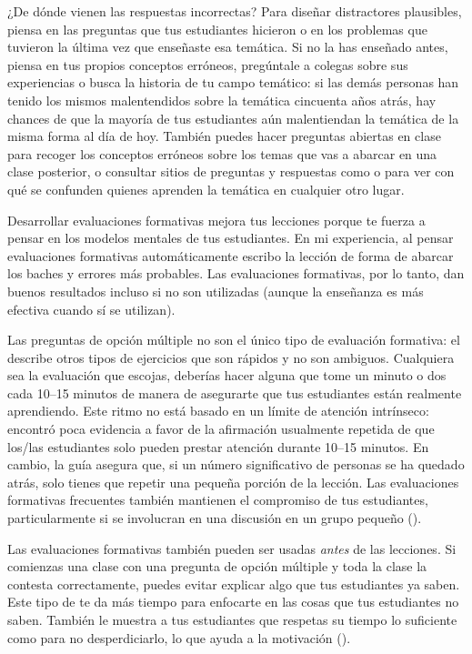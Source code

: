 \begin{aside}{¿De dónde vienen las respuestas incorrectas?}
 Para diseñar distractores plausibles,
piensa en las preguntas que tus estudiantes hicieron o en los problemas que tuvieron la última vez que enseñaste esa temática.
Si no la has enseñado antes,
piensa en tus propios conceptos erróneos,
pregúntale a colegas sobre sus experiencias
o busca la historia de tu campo temático:
si las demás personas han tenido los mismos malentendidos sobre la temática cincuenta años atrás,
hay chances de que la mayoría de tus estudiantes aún malentiendan la temática de la misma forma al día de hoy.
También puedes hacer preguntas abiertas en clase
para recoger los conceptos erróneos sobre los temas que vas a abarcar en una clase posterior,
o consultar sitios de preguntas y respuestas como 
  o 
  para ver con qué se confunden quienes aprenden la temática en cualquier otro lugar.
\end{aside}

Desarrollar evaluaciones formativas mejora tus lecciones
porque te fuerza a pensar en los modelos mentales de tus estudiantes.
En mi experiencia,
al pensar evaluaciones formativas automáticamente escribo la lección de forma de abarcar los baches y errores más probables.
Las evaluaciones formativas, por lo tanto, dan buenos resultados incluso si no son utilizadas
(aunque la enseñanza es más efectiva cuando sí se utilizan).

Las preguntas de opción múltiple no son el único tipo de evaluación formativa:
el  describe otros tipos de ejercicios que son rápidos y no son ambiguos.
Cualquiera sea la evaluación que escojas,
deberías hacer alguna que tome un minuto o dos cada 10--15 minutos
de manera de asegurarte que tus estudiantes están realmente aprendiendo.
Este ritmo no está basado en un límite de atención intrínseco: ~\cite{Wils2007}
encontró poca evidencia a favor de la afirmación usualmente repetida de que
los/las estudiantes solo pueden prestar atención durante 10--15 minutos.
En cambio,
la guía asegura que, si un número significativo de personas se ha quedado atrás,
solo tienes que repetir una pequeña porción de la lección.
Las evaluaciones formativas frecuentes también mantienen el compromiso de tus estudiantes, 
particularmente si se involucran en una discusión en un grupo pequeño
().

Las evaluaciones formativas también pueden ser usadas \emph{antes} de las lecciones.
Si comienzas una clase con una pregunta de opción múltiple y toda la clase la contesta correctamente,
puedes evitar explicar algo que tus estudiantes ya saben.
Este tipo de 
te da más tiempo para enfocarte en las cosas que tus estudiantes no saben.
También le muestra a tus estudiantes que respetas su tiempo lo suficiente como para no desperdiciarlo,
lo que ayuda a la motivación ().

